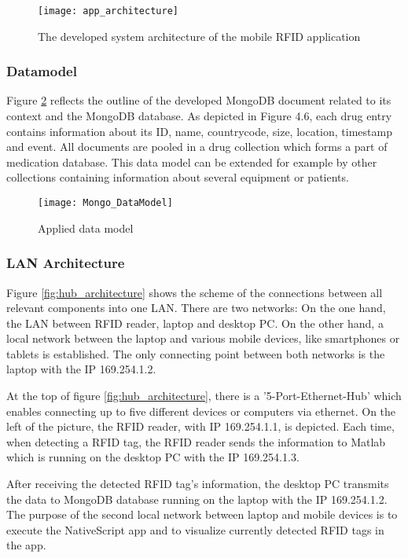 \begin{figure}
\centering
\texttt{[image: app\_architecture]} 
\caption{\label{fig:apparchitecture}The developed system architecture of the mobile RFID application} 
\end{figure}

\subsubsection{Datamodel}

Figure \ref{fig:datamodel} reflects the outline of the developed MongoDB document related to its context and the MongoDB database. As depicted in Figure 4.6, each drug entry contains information about its ID, name, countrycode, size, location, timestamp and event. All documents are pooled in a drug collection which forms a part of medication database. This data model can be extended for example by other collections containing information about several equipment or patients. 

\begin{figure}
\centering
\texttt{[image: Mongo\_DataModel]} 
\caption{\label{fig:datamodel}Applied data model} 
\end{figure}

\subsubsection{\ac{LAN} Architecture}

Figure \ref{fig:hub_architecture} shows the scheme of the connections between all relevant components into one LAN. There are two networks: On the one hand, the LAN between RFID reader, laptop and desktop PC. On the other hand, a local network between the laptop and various mobile devices, like smartphones or tablets is established. The only connecting point between both networks is the laptop with the IP 169.254.1.2.

At the top of figure \ref{fig:hub_architecture}, there is a '5-Port-Ethernet-Hub' which enables connecting up to five different devices or computers via ethernet. 
On the left of the picture, the RFID reader, with IP 169.254.1.1, is depicted. Each time, when detecting a RFID tag, the RFID reader sends the information to Matlab which is running on the desktop PC with the IP 169.254.1.3. 

After receiving the detected RFID tag's information, the desktop PC transmits the data to MongoDB database running on the laptop with the IP 169.254.1.2. 
The purpose of the second local network between laptop and mobile devices is to execute the NativeScript app and to visualize currently detected RFID tags in the app.

